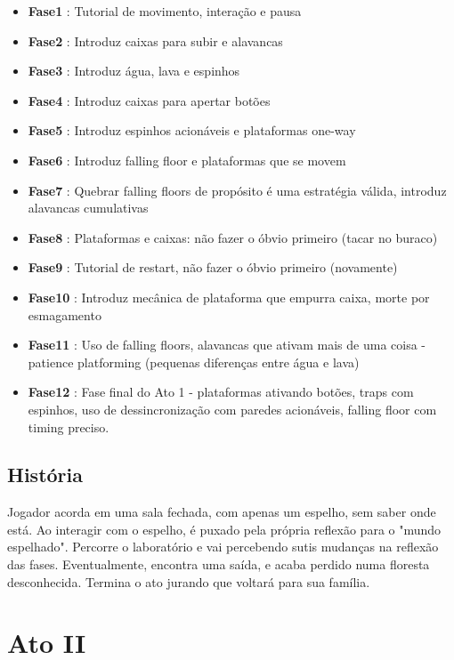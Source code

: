 \documentclass[a4paper, 11pt]{article}
\begin{document}
\begin{itemize}
	\begin{itemize} 
		\item \textbf{Fase1} : Tutorial de movimento, interação e pausa 
		\item \textbf{Fase2} : Introduz caixas para subir e alavancas
		\item \textbf{Fase3} : Introduz água, lava e espinhos
		\item \textbf{Fase4} : Introduz caixas para apertar botões
		\item \textbf{Fase5} : Introduz espinhos acionáveis e plataformas one-way
		\item \textbf{Fase6} : Introduz falling floor e plataformas que se movem
		\item \textbf{Fase7} : Quebrar falling floors de propósito é uma estratégia válida, introduz alavancas cumulativas
		\item \textbf{Fase8} : Plataformas e caixas: não fazer o óbvio primeiro (tacar no buraco)
		\item \textbf{Fase9} : Tutorial de restart, não fazer o óbvio primeiro (novamente)
		\item \textbf{Fase10} : Introduz mecânica de plataforma que empurra caixa, morte por esmagamento
		\item \textbf{Fase11} : Uso de falling floors, alavancas que ativam mais de uma coisa - patience platforming (pequenas diferenças entre água e lava)
		\item \textbf{Fase12} : Fase final do Ato 1 - plataformas ativando botões, traps com espinhos, uso de dessincronização com paredes acionáveis, falling floor com timing preciso.
	\end{itemize} 
 
\subsection{História} 
 
	Jogador acorda em uma sala fechada, com apenas um espelho, sem saber onde está. Ao interagir com o espelho, é puxado pela própria reflexão para o "mundo espelhado".
	Percorre o laboratório e vai percebendo sutis mudanças na reflexão das fases. Eventualmente, encontra uma saída, e acaba perdido numa floresta desconhecida. Termina o ato jurando que voltará para sua família.

\section{Ato II} 
 

\end{itemize}
\end{document}
